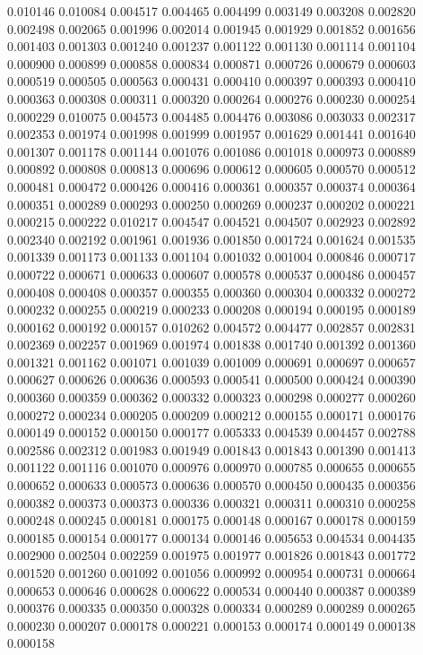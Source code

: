0.010146
0.010084
0.004517
0.004465
0.004499
0.003149
0.003208
0.002820
0.002498
0.002065
0.001996
0.002014
0.001945
0.001929
0.001852
0.001656
0.001403
0.001303
0.001240
0.001237
0.001122
0.001130
0.001114
0.001104
0.000900
0.000899
0.000858
0.000834
0.000871
0.000726
0.000679
0.000603
0.000519
0.000505
0.000563
0.000431
0.000410
0.000397
0.000393
0.000410
0.000363
0.000308
0.000311
0.000320
0.000264
0.000276
0.000230
0.000254
0.000229
0.010075
0.004573
0.004485
0.004476
0.003086
0.003033
0.002317
0.002353
0.001974
0.001998
0.001999
0.001957
0.001629
0.001441
0.001640
0.001307
0.001178
0.001144
0.001076
0.001086
0.001018
0.000973
0.000889
0.000892
0.000808
0.000813
0.000696
0.000612
0.000605
0.000570
0.000512
0.000481
0.000472
0.000426
0.000416
0.000361
0.000357
0.000374
0.000364
0.000351
0.000289
0.000293
0.000250
0.000269
0.000237
0.000202
0.000221
0.000215
0.000222
0.010217
0.004547
0.004521
0.004507
0.002923
0.002892
0.002340
0.002192
0.001961
0.001936
0.001850
0.001724
0.001624
0.001535
0.001339
0.001173
0.001133
0.001104
0.001032
0.001004
0.000846
0.000717
0.000722
0.000671
0.000633
0.000607
0.000578
0.000537
0.000486
0.000457
0.000408
0.000408
0.000357
0.000355
0.000360
0.000304
0.000332
0.000272
0.000232
0.000255
0.000219
0.000233
0.000208
0.000194
0.000195
0.000189
0.000162
0.000192
0.000157
0.010262
0.004572
0.004477
0.002857
0.002831
0.002369
0.002257
0.001969
0.001974
0.001838
0.001740
0.001392
0.001360
0.001321
0.001162
0.001071
0.001039
0.001009
0.000691
0.000697
0.000657
0.000627
0.000626
0.000636
0.000593
0.000541
0.000500
0.000424
0.000390
0.000360
0.000359
0.000362
0.000332
0.000323
0.000298
0.000277
0.000260
0.000272
0.000234
0.000205
0.000209
0.000212
0.000155
0.000171
0.000176
0.000149
0.000152
0.000150
0.000177
0.005333
0.004539
0.004457
0.002788
0.002586
0.002312
0.001983
0.001949
0.001843
0.001843
0.001390
0.001413
0.001122
0.001116
0.001070
0.000976
0.000970
0.000785
0.000655
0.000655
0.000652
0.000633
0.000573
0.000636
0.000570
0.000450
0.000435
0.000356
0.000382
0.000373
0.000373
0.000336
0.000321
0.000311
0.000310
0.000258
0.000248
0.000245
0.000181
0.000175
0.000148
0.000167
0.000178
0.000159
0.000185
0.000154
0.000177
0.000134
0.000146
0.005653
0.004534
0.004435
0.002900
0.002504
0.002259
0.001975
0.001977
0.001826
0.001843
0.001772
0.001520
0.001260
0.001092
0.001056
0.000992
0.000954
0.000731
0.000664
0.000653
0.000646
0.000628
0.000622
0.000534
0.000440
0.000387
0.000389
0.000376
0.000335
0.000350
0.000328
0.000334
0.000289
0.000289
0.000265
0.000230
0.000207
0.000178
0.000221
0.000153
0.000174
0.000149
0.000138
0.000158
